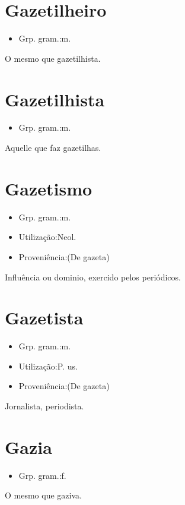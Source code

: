 \section{Gazetilheiro}
\begin{itemize}
\item {Grp. gram.:m.}
\end{itemize}
O mesmo que \textunderscore gazetilhista\textunderscore .
\section{Gazetilhista}
\begin{itemize}
\item {Grp. gram.:m.}
\end{itemize}
Aquelle que faz gazetilhas.
\section{Gazetismo}
\begin{itemize}
\item {Grp. gram.:m.}
\end{itemize}
\begin{itemize}
\item {Utilização:Neol.}
\end{itemize}
\begin{itemize}
\item {Proveniência:(De \textunderscore gazeta\textunderscore )}
\end{itemize}
Influência ou dominio, exercido pelos periódicos.
\section{Gazetista}
\begin{itemize}
\item {Grp. gram.:m.}
\end{itemize}
\begin{itemize}
\item {Utilização:P. us.}
\end{itemize}
\begin{itemize}
\item {Proveniência:(De \textunderscore gazeta\textunderscore )}
\end{itemize}
Jornalista, periodista.
\section{Gazia}
\begin{itemize}
\item {Grp. gram.:f.}
\end{itemize}
O mesmo que \textunderscore gaziva\textunderscore .
